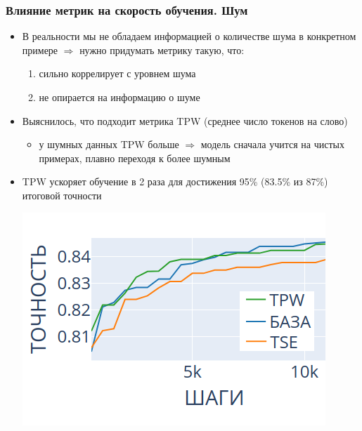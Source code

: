 \documentclass{beamer}
\begin{document}
\begin{frame}
	\frametitle{Влияние метрик на скорость обучения. Шум}
	\begin{itemize}
		\item В реальности мы не обладаем информацией о количестве шума в конкретном примере $\Rightarrow$ нужно придумать метрику такую, что:
		\begin{enumerate}
			\item сильно коррелирует с уровнем шума
			\item не опирается на информацию о шуме
		\end{enumerate}
		\item Выяснилось, что подходит метрика TPW (среднее число токенов на слово)
			\begin{itemize}
				\item у шумных данных TPW больше $\Rightarrow$ модель сначала учится на чистых примерах, плавно переходя к более шумным
			\end{itemize}
		\item TPW ускоряет обучение в 2 раза для достижения 95\% (83.5\% из 87\%) итоговой точности

		\centering
		\includegraphics[scale=0.45]{keyboard_noise_TPW_win}		
	\end{itemize}
\end{frame}
\end{document}
